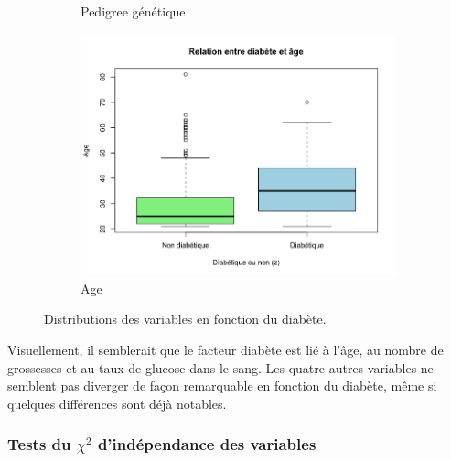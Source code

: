\documentclass[a4paper,11pt]{report}
\begin{document}
\begin{figure}[H]
\begin{subfigure}[b]{0.25\linewidth}
		\caption{\scriptsize Pedigree génétique}
		\label{fig:1-3-2-boxplot-diabete-pedigree}
	\end{subfigure}%
	\begin{subfigure}[b]{0.25\linewidth}
		\centering
		\captionsetup{justification=centering}
		\includegraphics[width=1\linewidth]{img/1-3-2-boxplot-diabete-age}
		\caption{\scriptsize Age}
		\label{fig:1-3-2-boxplot-diabete-age}
	\end{subfigure}%
	\caption{
		\small Distributions des variables en fonction du diabète.
	}
	\label{fig:box_plot_diabete_pima}%
\end{figure}




Visuellement, il semblerait que le facteur diabète est lié à l'âge, au nombre de grossesses et au taux de glucose dans le sang. Les quatre autres variables ne semblent pas diverger de façon remarquable en fonction du diabète, même si quelques différences sont déjà notables.



\subsubsection{Tests du $\chi^2$ d'indépendance des variables}
\end{document}
